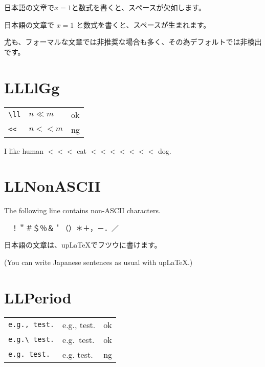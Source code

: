 \documentclass[a4paper]{article}
\newcommand{\tA}[1]{\textcolor{cA}{#1}}
\newcommand{\tD}[1]{\textcolor{cD}{#1}}
\begin{document}
\begin{CJK}{UTF8}{ipxm}
	日本語の文章で$x=1$と数式を書くと、スペースが欠如します。

	日本語の文章で $x=1$ と数式を書くと、スペースが生まれます。

	尤も、フォーマルな文章では非推奨な場合も多く、その為デフォルトでは非検出です。
\end{CJK}

\section{LLLlGg}

\begin{table}[H]
	\centering
	\begin{tabular}{lll}
		\verb|\ll| & $n\ll m$ & \tA{ok} \\
		\verb|<<|  & $n << m$ & \tD{ng} \\
	\end{tabular}
\end{table}

I like human $<<<$ cat $<<<<<<<$ dog.

\section{LLNonASCII}

The following line contains non-ASCII characters.

\begin{CJK}{UTF8}{ipxm}{　}！＂＃＄％＆＇（）＊＋，－．／\end{CJK}

\vspace{\baselineskip}

\begin{CJK}{UTF8}{ipxm}日本語の文章は、upLaTeXでフツウに書けます。\end{CJK}

(You can write Japanese sentences as usual with upLaTeX.)

\section{LLPeriod}

\begin{table}[H]
	\centering
	\begin{tabular}{lll}
		\verb|e.g., test.| & e.g., test. & \tA{ok} \\
		\verb|e.g.\ test.| & e.g.\ test. & \tA{ok} \\
		\verb|e.g. test.|  & e.g. test.  & \tD{ng} \\
	\end{tabular}
\end{table}
\end{document}
